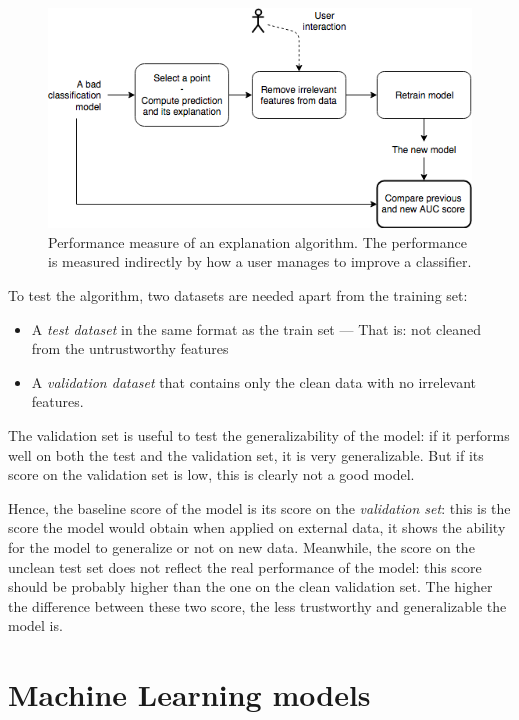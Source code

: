 \documentclass[a4paper,11pt]{kth-mag}
\begin{document}
\begin{figure}[h!]
		\centering
    	\includegraphics[scale=0.5]{img/method_schema.png}
    	\caption{Performance measure of an explanation algorithm. The performance is measured indirectly by how a user manages to improve a classifier.}
\end{figure}

To test the algorithm, two datasets are needed apart from the training set: 

\begin{itemize}
	\item A \textit{test dataset} in the same format as the train set --- That is: not cleaned from the untrustworthy features
	\item A \textit{validation dataset} that contains only the clean data with no irrelevant features.
\end{itemize}

The validation set is useful to test the generalizability of the model: if it performs well on both the test and the validation set, it is very generalizable. But if its score on the validation set is low, this is clearly not a good model. 

Hence, the baseline score of the model is its score on the \textit{validation set}: this is the score the model would obtain when applied on external data, it shows the ability for the model to generalize or not on new data. Meanwhile, the score on the unclean test set does not reflect the real performance of the model: this score should be probably higher than the one on the clean validation set. The higher the difference between these two score, the less trustworthy and generalizable the model is.

\section{Machine Learning models}
\end{document}
